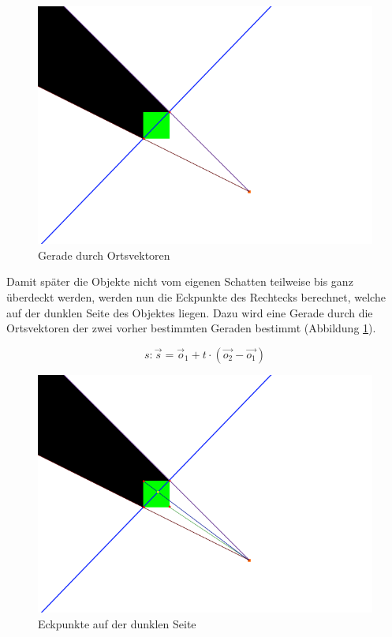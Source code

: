\begin{figure}[t]
	\centering
	\includegraphics[width=\columnwidth]{images/durchfuehrung_2.png}
	\caption{Gerade durch Ortsvektoren}
	\label{fig:durch4}
\end{figure}

Damit später die Objekte nicht vom eigenen Schatten teilweise bis ganz überdeckt werden, werden nun
die Eckpunkte des Rechtecks berechnet, welche auf der dunklen Seite des Objektes liegen. Dazu wird
eine Gerade durch die Ortsvektoren der zwei vorher bestimmten Geraden bestimmt (Abbildung
\ref{fig:durch4}).

\begin{equation}
	s: \vec{s} = \vec{o}_1 + t \cdot \left(\vec{o_2} - \vec{o_1}\right)
\end{equation}

\begin{figure}[t]
	\centering
	\includegraphics[width=\columnwidth]{images/durchfuehrung_3.png}
	\caption{Eckpunkte auf der dunklen Seite}
	\label{fig:durch5}
\end{figure}

